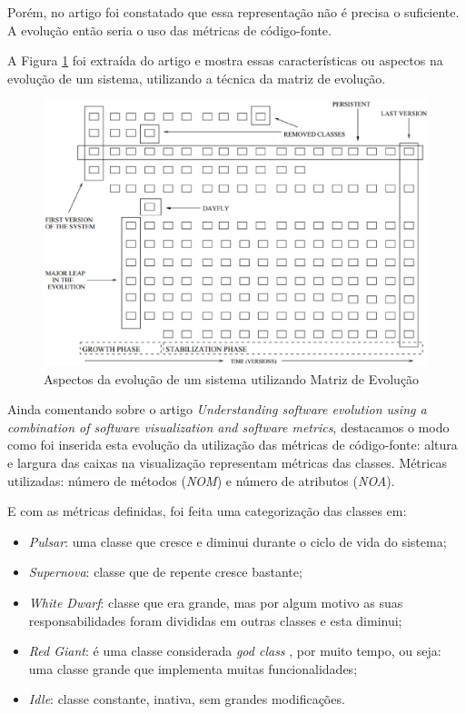 Porém, no artigo foi constatado que essa representação não é precisa o suficiente.
A evolução então seria o uso das métricas de código-fonte.

A Figura \ref{fig:evolutionMatrixAspects} foi extraída do artigo e mostra essas
características ou aspectos na evolução de um sistema, utilizando a técnica da
matriz de evolução.

\begin{figure}[!htb]
  \centering
    \includegraphics[keepaspectratio=true,scale=0.5]
    {figuras/evolutionMatrixAspects.eps}
  \caption{Aspectos da evolução de um sistema utilizando Matriz de Evolução
  \cite{Lanza02understandingsoftware}}
  \label{fig:evolutionMatrixAspects}
\end{figure}


Ainda comentando sobre o artigo \textit{Understanding software evolution using
a combination of software visualization and software metrics}, destacamos
o modo como foi inserida esta evolução da utilização das métricas de código-fonte:
altura e largura das caixas na visualização representam métricas das
classes. Métricas utilizadas: número de métodos (\textit{NOM}) e número de
atributos (\textit{NOA}).

E com as métricas definidas, foi feita uma categorização das classes em:

\begin{itemize}
  \item \textit{Pulsar}: uma classe que cresce e diminui durante o ciclo de
  vida do sistema;
  \item \textit{Supernova}: classe que de repente cresce bastante;
  \item \textit{White Dwarf}: classe que era grande, mas por algum motivo as
  suas responsabilidades foram divididas em outras classes e esta diminui;
  \item \textit{Red Giant}: é uma classe considerada \textit{god class}
  \cite{riel1996object}, por muito tempo, ou seja: uma classe grande que
  implementa muitas funcionalidades;
  \item \textit{Idle}: classe constante, inativa, sem grandes modificações.
\end{itemize}

